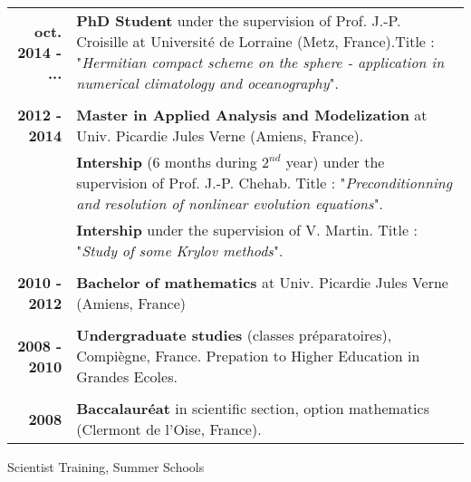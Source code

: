 \documentclass[10pt,a4paper]{report}
\begin{document}
\begin{center}
\begin{tabular}{r p{12cm}}
\textbf{oct. 2014 - ...} & \textbf{PhD Student} under the supervision of Prof. J.-P. Croisille at Université de Lorraine (Metz, France).\newline Title : "\textit{Hermitian compact scheme on the sphere - application in numerical climatology and oceanography}".\\

& \\

\textbf{2012 - 2014} & \textbf{Master in Applied Analysis and Modelization} at Univ. Picardie Jules Verne (Amiens, France). \\

& \textbf{Intership} (6 months during $2^{nd}$ year) under the supervision of Prof. J.-P. Chehab. \newline 
Title : "\textit{Preconditionning and resolution of nonlinear evolution equations}". \\

& \textbf{Intership} under the supervision of V. Martin. \newline 
Title : "\textit{Study of some Krylov methods}". \\

& \\

\textbf{2010 - 2012} & \textbf{Bachelor of mathematics} at Univ. Picardie Jules Verne (Amiens, France) \\

& \\

\textbf{2008 - 2010} & \textbf{Undergraduate studies} (classes préparatoires), Compiègne, France.\newline
Prepation to Higher Education in Grandes Ecoles. \\

& \\

\textbf{2008} & \textbf{Baccalauréat} in scientific section, option mathematics (Clermont de l'Oise, France).\\
\end{tabular}
\end{center}

\vspace{1cm}
\noindent
{\selectfont
\begin{Large}
Scientist Training, Summer Schools
\end{Large}
\hrulefill
}
\end{document}

